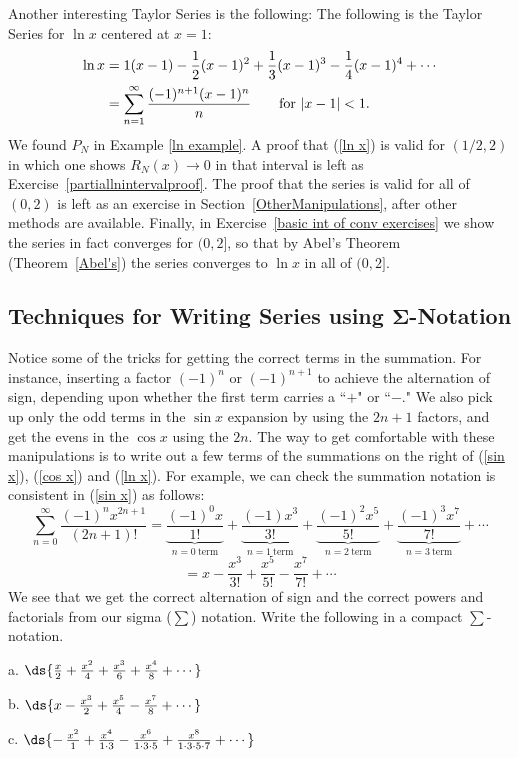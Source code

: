 Another interesting Taylor Series is the following:
\bprop The following is the Taylor Series for $\ln x$
centered at $x=1$: 
\begin{align}
\ln x&=1(x-1)-\frac12(x-1)^2+\frac13(x-1)^3-\frac14(x-1)^4+\cdots
\label{ln x}\\
&=\sum_{n=1}^\infty\frac{(-1)^{n+1}(x-1)^n}{n}
\qquad\text{for } |x-1|<1.\notag 
\end{align}
\label{ln series prop}\eprop
We found $P_N$ in Example \ref{ln example}.  
A proof that (\ref{ln x}) is valid for $(1/2,2)$ in which one shows
$R_N(x)\to0$ in that interval is left as Exercise~\ref{partiallnintervalproof}.
The proof that the series is valid for all of $(0,2)$
is left as an exercise in  Section~\ref{OtherManipulations},
after other methods are available.
Finally, in Exercise~\ref{basic int of conv exercises} we show
the series in fact converges for $(0,2]$, so that by Abel's Theorem
(Theorem~\ref{Abel's}) the series converges to $\ln x$ in
all of $(0,2]$. 


\subsection{Techniques for Writing Series
using $\mathbf{\Sigma}$-Notation}
Notice some of the tricks for getting the correct terms in the
summation.  For instance, inserting a factor $(-1)^n$ or 
$(-1)^{n+1}$ to achieve the alternation of sign, depending
upon whether the first term carries a ``$+$" or ``$-$." 
We also pick up only the odd terms in the $\sin x$ expansion
by using the $2n+1$ factors, and get the evens in the $\cos x$
using the $2n$.  The way to get comfortable with these manipulations
is to write out a few terms of the summations on the
right of (\ref{sin x}), (\ref{cos x}) and (\ref{ln x}).  For example,
we can check the summation notation is consistent
 in (\ref{sin x}) as follows: 
$$\sum_{n=0}^\infty\frac{(-1)^{n}x^{2n+1}}{(2n+1)!}
=\underbrace{\frac{(-1)^0x}{1!}}_{n=0\ \mathrm{term}}
+\underbrace{\frac{(-1)x^3}{3!}}_{n=1\ \mathrm{term}}
+\underbrace{\frac{(-1)^2x^5}{5!}}_{n=2\ \mathrm{term}}
+\underbrace{\frac{(-1)^3x^7}{7!}}_{n=3\ \mathrm{term}}+\cdots     $$ 
$$=x-\frac{x^3}{3!}+\frac{x^5}{5!}-\frac{x^7}{7!}+\cdots
$$
We see that we get the correct alternation of sign and 
the correct powers and factorials from our sigma ($\sum$)
notation.
\bex Write the following in a compact $\sum$-notation.
\begin{description}  
\item a. $\ds{\frac{x}2+\frac{x^2}{4}+\frac{x^3}{6}+\frac{x^4}{8}+\cdots}$
\item b. $\ds{x-\frac{x^3}{2}+\frac{x^5}{4}-\frac{x^7}{8}+\cdots}$
\item c. $\ds{-\,\frac{x^2}{1}+\frac{x^4}{1\cdot3}-\frac{x^6}{1\cdot3\cdot5}
	+\frac{x^8}{1\cdot3\cdot5\cdot7}+\cdots}$
\end{description}

